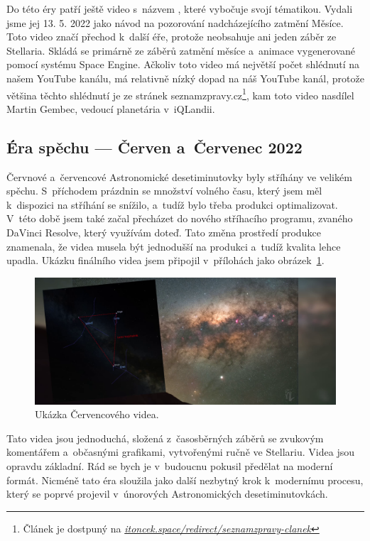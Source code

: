 \documentclass[12pt,a4paper,titlepage]{article}
\newcommand{\link}[2]{\href{#1}{\textcolor{link-color}{\textit{#2}}}}%
\begin{document}
Do této éry patří ještě video s~názvem , které vybočuje svojí tématikou. Vydali jsme jej 13. 5. 2022 jako návod na pozorování nadcházejícího zatmění Měsíce. Toto video značí přechod k~další éře, protože neobsahuje ani jeden záběr ze Stellaria. Skládá se primárně ze záběrů zatmění měsíce a~animace vygenerované pomocí systému Space Engine. Ačkoliv toto video má největší počet shlédnutí na našem YouTube kanálu, má relativně nízký dopad na náš YouTube kanál, protože většina těchto shlédnutí je ze stránek seznam\-zpravy.cz\footnote{Článek je dostpuný na \link{https://mp.itoncek.space/redirect/seznamzpravy-clanek}{itoncek.space/redirect/seznamzpravy-clanek}}, kam toto video nasdílel Martin Gembec, vedoucí planetária v~iQLandii.
\subsection{Éra spěchu --- Červen a~Červenec 2022}
Červnové a~červencové Astronomické desetiminutovky byly stříhány ve velikém spěchu. S~příchodem prázdnin se množství volného času, který jsem měl k~dispozici na stříhání se snížilo, a~tudíž bylo třeba produkci optimalizovat. V~této době jsem také začal přecházet do nového stříhacího programu, zvaného DaVinci Resolve, který využívám doteď. Tato změna prostředí produkce znamenala, že videa musela být jednodušší na produkci a~tudíž kvalita lehce upadla. Ukázku finálního videa jsem připojil v~přílohách jako obrázek~\ref{img:cervenec}.

\begin{figure}[H]
	\centering
	\includegraphics[width=.85\textwidth]{cervenec.png}
	\caption{Ukázka Červencového videa.}\label{img:cervenec}
\end{figure}

Tato videa jsou jednoduchá, složená z~časosběrných záběrů se zvukovým komentářem a~občasnými grafikami, vytvořenými ručně ve Stellariu. Videa jsou opravdu základní. Rád se bych je v~budoucnu pokusil předělat na moderní formát. Nicméně tato éra sloužila jako další nezbytný krok k~modernímu procesu, který se poprvé projevil v~únorových Astronomických desetiminutovkách.
\end{document}
